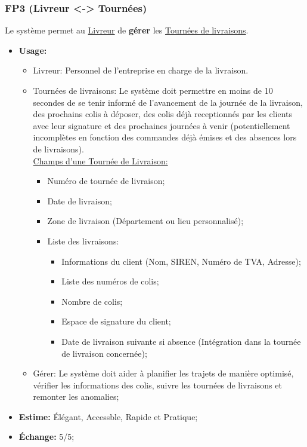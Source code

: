 \documentclass{article}
\begin{document}
\subsubsection{FP3 (Livreur <-> Tournées)}\label{cat:fp3}
Le système permet au \uline{Livreur} de \textbf{gérer} les \uline{Tournées de
livraisons}.
\begin{itemize}
	\item \textbf{Usage:} \begin{itemize}
		\item Livreur: Personnel de l'entreprise en charge de la livraison.
		\item Tournées de livraisons: Le système doit permettre en moins de 10
			  secondes de se tenir informé de l'avancement de la journée de la
			  livraison, des prochains colis à déposer, des colis déjà
			  receptionnés par les clients avec leur signature et des prochaines
			  journées à venir (potentiellement incomplètes en fonction des
			  commandes déjà émises et des absences lors de livraisons).\\
			  \uline{Champs d'une Tournée de Livraison:}
			  \begin{itemize}
				\item Numéro de tournée de livraison;
				\item Date de livraison;
				\item Zone de livraison (Département ou lieu personnalisé);
				\item Liste des livraisons: \begin{itemize}
					\item Informations du client (Nom, SIREN, Numéro de TVA,
					  Adresse);
					\item Liste des numéros de colis;
					\item Nombre de colis;
					\item Espace de signature du client;
					\item Date de livraison suivante si absence (Intégration
						  dans la tournée de livraison concernée);
				\end{itemize}
			  \end{itemize}
		\item Gérer: Le système doit aider à planifier les trajets de
			  manière optimisé, vérifier les informations des colis, suivre
			  les tournées de livraisons et remonter les anomalies;
	\end{itemize}
	\item \textbf{Estime:} Élégant, Accessble, Rapide et Pratique;
	\item \textbf{Échange:} 5/5;
\end{itemize}
\end{document}
